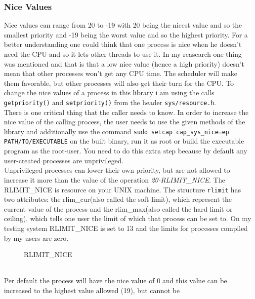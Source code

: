 \subsubsection{Nice Values}
Nice values can range from 20 to
-19 with 20 being the nicest value and so the smallest priority and -19 being the worst value and so
the highest priority. For a better understanding one could think that one process is nice when he doesn't need
the CPU and so it lets other threads to use it. In my reasearch one thing was mentioned and that is
that a low nice value (hence a high priority) doesn't mean that other processes won't get any CPU
time. The scheduler will make them favorable, but other processes will also get their turn for the
CPU.
To change the nice values of a process in this library i am using
the calls \texttt{getpriority()} and \texttt{setpriority()} from the header \texttt{sys/resource.h}.\\
There is one
critical thing that the caller needs to know. In order to increase the nice value of the calling
process, the user needs to use the given methods of the library and additionally use the command
\texttt{sudo setcap cap\_sys\_nice=ep PATH/TO/EXECUTABLE} on the built binary, run it as root or build the executable
program as the root-user. You need to do this extra step
because by default any user-created processes are unprivileged.\\
Unprivileged processes can lower their own
priority, but are not allowed to increase it more than the value of the operation
\textit{20-RLIMIT\_NICE}. The RLIMIT\_NICE is resource on your UNIX machine. The structure \texttt{rlimit} has two attributes: the \dq rlim\_cur\dq{}(also called the soft limit), which represent the current value of the process and the \dq rlim\_max\dq{}(also called the hard limit or ceiling), which tells one user the limit of which that process can be set to. On my testing system
RLIMIT\_NICE is set to 13 and the limits for processes compiled by my users are zero.
\begin{figure*}[!htb]
	\centering
	\caption{RLIMIT\_NICE} 
	\label{RLIMIT_NICE}
\end{figure*}
\\
Per default the process will have
the nice value of 0 and this value can be increased to the highest value allowed (19), but cannot be
